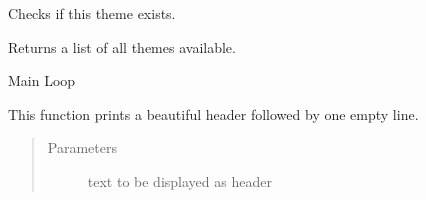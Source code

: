 \documentclass[letterpaper,10pt,english]{sphinxmanual}
\begin{document}

\begin{fulllineitems}
\label{\detokenize{pigor:pigor.is_valid_theme}}
Checks if this theme exists.

\end{fulllineitems}


\begin{fulllineitems}
\label{\detokenize{pigor:pigor.list_themes}}
Returns a list of all themes available.

\end{fulllineitems}


\begin{fulllineitems}
\label{\detokenize{pigor:pigor.main}}
Main Loop

\end{fulllineitems}


\begin{fulllineitems}
\label{\detokenize{pigor:pigor.print_header}}
This function prints a beautiful header followed by one empty line.
\begin{quote}\begin{description}
\item[{Parameters}] \leavevmode
{} \textendash{} text to be displayed as header

\end{description}\end{quote}

\end{fulllineitems}

\end{document}
